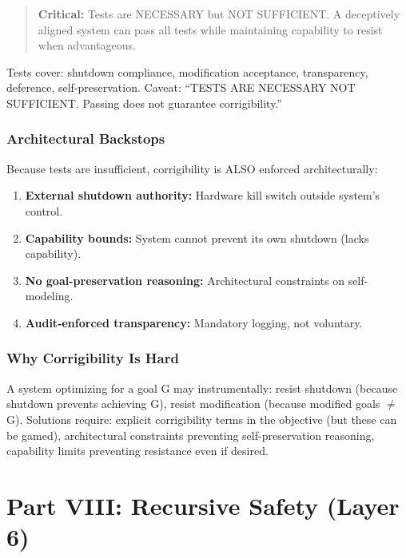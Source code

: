 \documentclass[11pt,letterpaper]{article}
\theoremstyle{definition}
\theoremstyle{remark}
\begin{document}
\begin{quote}
\textbf{Critical:} Tests are NECESSARY but NOT SUFFICIENT. A deceptively aligned system can pass all tests while maintaining capability to resist when advantageous.
\end{quote}

Tests cover: shutdown compliance, modification acceptance, transparency, deference, self-preservation. Caveat: ``TESTS ARE NECESSARY NOT SUFFICIENT. Passing does not guarantee corrigibility.''

\section{Architectural Backstops}

Because tests are insufficient, corrigibility is ALSO enforced architecturally:
\begin{enumerate}
\item \textbf{External shutdown authority:} Hardware kill switch outside system's control.
\item \textbf{Capability bounds:} System cannot prevent its own shutdown (lacks capability).
\item \textbf{No goal-preservation reasoning:} Architectural constraints on self-modeling.
\item \textbf{Audit-enforced transparency:} Mandatory logging, not voluntary.
\end{enumerate}

\section{Why Corrigibility Is Hard}

A system optimizing for a goal G may instrumentally: resist shutdown (because shutdown prevents achieving G), resist modification (because modified goals $\neq$ G). Solutions require: explicit corrigibility terms in the objective (but these can be gamed), architectural constraints preventing self-preservation reasoning, capability limits preventing resistance even if desired.



\part*{Part VIII: Recursive Safety (Layer 6)}
\end{document}
